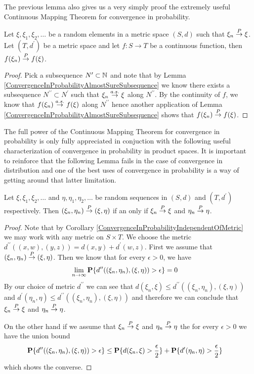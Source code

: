 The previous lemma also gives us a very simply proof the extremely
useful Continuous Mapping Theorem for convergence in probability.
\begin{lem}\label{ContinuousMappingProbability}Let $\xi, \xi_1, \xi_2, \dots$ be a random elements in a
  metric space $(S,d)$ such that $\xi_n \overset{P}\to \xi$.  Let
  $(T,d^\prime)$ be a metric space and let $f : S \to
  T$ be a continuous function, then $f(\xi_n) \overset{P}\to f(\xi)$.
\end{lem}
\begin{proof}
Pick a subsequence $N^\prime \subset \mathbb{N}$ and note that by Lemma
\ref{ConvergenceInProbabilityAlmostSureSubsequence} we know there
exists a subsequence $N^{\prime \prime} \subset N^\prime$ such that
$\xi_n \overset{a.s.}\to \xi$ along $N^{\prime \prime}$.  By the continuity of $f$,
we know that $f(\xi_n) \overset{a.s.}\to f(\xi)$ along $N^{\prime \prime}$ hence
another application of Lemma
\ref{ConvergenceInProbabilityAlmostSureSubsequence}  shows that
$f(\xi_n) \overset{P}\to f(\xi)$.
\end{proof}
The full power of the Continuous Mapping Theorem for convergence in
probability is only fully appreciated in conjuction with the following
useful characterization of convergence in probability in product
spaces.  It is important to reinforce that the following Lemma fails
in the case of convergence in distribution and one of the best uses of
convergence in probability is a way of getting around that latter
limitation.
\begin{lem}\label{ConvergenceInProbabilityInProductSpaces}Let $\xi, \xi_1, \xi_2, \dots$ and $\eta, \eta_1, \eta_2,
  \dots$ be random sequences in $(S,d)$ and $(T,d^\prime)$
  respectively.  Then $(\xi_n, \eta_n) \overset{P}\to (\xi, \eta)$ if an only
  if $\xi_n \overset{P}\to \xi$ and $\eta_n \overset{P}\to \eta$.
\end{lem}
\begin{proof}
Note that by Corollary
\ref{ConvergenceInProbabilityIndependentOfMetric} we may work with any
metric on $S \times T$.  We choose the metric $d^{\prime\prime}((x,w), (y,z)) =
d(x,y) + d^\prime(w,z)$.
First we assume that $(\xi_n, \eta_n) \overset{P}\to (\xi, \eta)$.  Then we
know that for every $\epsilon > 0$, we have
\begin{align*}
\lim_{n \to \infty} \textbf{P}\{d^{\prime\prime}((\xi_n,\eta_n),
  (\xi, \eta)) > \epsilon\} &= 0
\end{align*}
By our choice of metric $d^{\prime\prime}$ we can see that $d(\xi_n,
\xi) \leq d^{\prime\prime}((\xi_n,\eta_n),
  (\xi, \eta))$ and $d^\prime(\eta_n,\eta) \leq d^{\prime\prime}((\xi_n,\eta_n),
  (\xi, \eta))$ and therefore we can conclude that $\xi_n \overset{P}\to \xi$
  and $\eta_n \overset{P}\to \eta$.  

On the other hand if we assume that  $\xi_n \overset{P}\to \xi$ and $\eta_n
\overset{P}\to \eta$ the for every $\epsilon > 0$ we have the union bound
\begin{align*}
\textbf{P}\{d^{\prime\prime}((\xi_n,\eta_n),
  (\xi, \eta)) > \epsilon\} &\leq \textbf{P}\{d(\xi_n,\xi) > \frac{\epsilon}{2}\}
  + \textbf{P}\{d^\prime(\eta_n,\eta) > \frac{\epsilon}{2}\}
\end{align*}
which shows the converse.
\end{proof}
